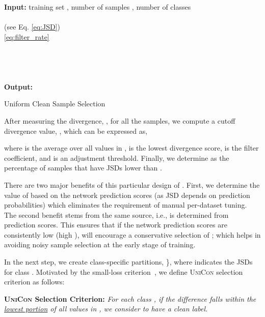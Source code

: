 \documentclass[10pt,twocolumn,letterpaper]{article}
\begin{document}
\begin{algorithm}[htb]
	
	\DontPrintSemicolon
	\small
	\textbf{Input:} training set , number of samples , number of classes  \\
	    \For{ \KwTo  }
	    {
    	     \\
 (see Eq. \eqref{eq:JSD}) \\
	    }
	    \eqref{eq:filter_rate} \\
	    \\
	     \\ 
	    \\
	   \For{ \KwTo }{
	     \\
	     \\
	     \\
	    }
	     \\
		
\textbf{Output:} 
	\caption{\small Uniform Clean Sample Selection}
	\label{alg:UniCon}
\end{algorithm}

After measuring the divergence, , for all the samples, we compute a cutoff divergence value, , which can be expressed as,  

where  is the average over all values in ,  is the lowest divergence score,  is the filter coefficient, and  is an adjustment threshold. Finally, we determine  as the percentage of samples that have JSDs lower than .  

There are two major benefits of this particular design of . First, we determine the value of  based on the network prediction scores (as JSD depends on prediction probabilities) which eliminates the requirement of manual per-dataset tuning. The second benefit stems from the same source, i.e.,  is determined from prediction scores. This ensures that if the network prediction scores are consistently low (high ),  will encourage a conservative selection of ; which helps in avoiding noisy sample selection at the early stage of training. 




In the next step, we create class-specific partitions, \}, where  indicates the JSDs for class . Motivated by the small-loss criterion~\cite{li2020dividemix}, we define \textsc{UniCon} selection criterion as follows:

\textbf{\textsc{UniCon} Selection Criterion:} 
{\it For each class , if the difference  falls within the \underline{lowest  portion} of all values in , we consider  to have a clean label.} 
\end{document}
